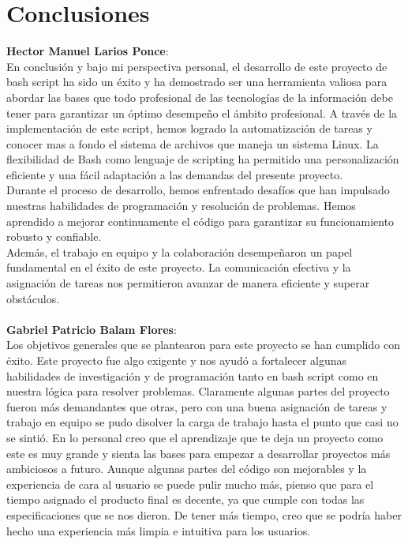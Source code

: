 \documentclass[titlepage]{article}
\begin{document}
\section{Conclusiones}
\textbf{Hector Manuel Larios Ponce}:\\En conclusión y bajo mi perspectiva personal, el desarrollo de este proyecto de bash script ha sido un éxito y ha demostrado ser una herramienta valiosa para abordar las bases que todo profesional de las tecnologías de la información debe tener para garantizar un óptimo desempeño el ámbito profesional. A través de la implementación de este script, hemos logrado la automatización de tareas y conocer mas a fondo el sistema de archivos que maneja un sistema Linux. La flexibilidad de Bash como lenguaje de scripting ha permitido una personalización eficiente y una fácil adaptación a las demandas del presente proyecto.\\Durante el proceso de desarrollo, hemos enfrentado desafíos que han impulsado nuestras habilidades de programación y resolución de problemas. Hemos aprendido a mejorar continuamente el código para garantizar su funcionamiento robusto y confiable.\\Además, el trabajo en equipo y la colaboración desempeñaron un papel fundamental en el éxito de este proyecto. La comunicación efectiva y la asignación de tareas nos permitieron avanzar de manera eficiente y superar obstáculos.
\\\\

\textbf{Gabriel Patricio Balam Flores}:\\Los objetivos generales que se plantearon para este proyecto se han cumplido con éxito. Este proyecto fue algo exigente y nos ayudó a fortalecer algunas habilidades de investigación y de programación tanto en bash script como en nuestra lógica para resolver problemas. Claramente algunas partes del proyecto fueron más demandantes que otras, pero con una buena asignación de tareas y trabajo en equipo se pudo disolver la carga de trabajo hasta el punto que casi no se sintió.
En lo personal creo que el aprendizaje que te deja un proyecto como este es muy grande y sienta las bases para empezar a desarrollar proyectos más ambiciosos a futuro. Aunque algunas partes del código son mejorables y la experiencia de cara al usuario se puede pulir mucho más, pienso que para el tiempo asignado el producto final es decente, ya que cumple con todas las especificaciones que se nos dieron. De tener más tiempo, creo que se podría haber hecho una experiencia más limpia e intuitiva para los usuarios.
\end{document}
